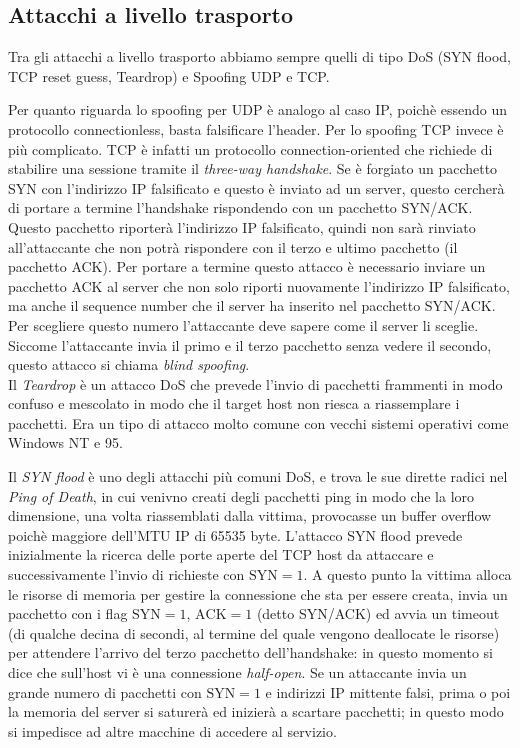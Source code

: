 \subsection{Attacchi a livello trasporto}
Tra gli attacchi a livello trasporto abbiamo sempre quelli di tipo DoS (SYN flood, TCP reset guess, Teardrop) e Spoofing UDP e TCP.

Per quanto riguarda lo spoofing per UDP è analogo al caso IP, poichè essendo un protocollo connectionless, basta falsificare l'header. Per lo spoofing TCP invece è più complicato. TCP è infatti un protocollo connection-oriented che richiede di stabilire una sessione tramite il \textit{three-way handshake}. Se è forgiato un pacchetto SYN con l'indirizzo IP falsificato e questo è inviato ad un server, questo cercherà di portare a termine l'handshake rispondendo con un pacchetto SYN/ACK. Questo pacchetto riporterà l'indirizzo IP falsificato, quindi non sarà rinviato all'attaccante che non potrà rispondere con il terzo e ultimo pacchetto (il pacchetto ACK). Per portare a termine questo attacco è necessario inviare un pacchetto ACK al server che non solo riporti nuovamente l'indirizzo IP falsificato, ma anche il sequence number che il server ha inserito nel pacchetto SYN/ACK. Per scegliere questo numero l'attaccante deve sapere come il server li sceglie. Siccome l'attaccante invia il primo e il terzo pacchetto senza vedere il secondo, questo attacco si chiama \textit{blind spoofing}.\\

Il \textit{Teardrop} è un attacco DoS che prevede l'invio di pacchetti frammenti in modo confuso e mescolato in modo che il target host non riesca a riassemplare i pacchetti. Era un tipo di attacco molto comune con vecchi sistemi operativi come Windows NT e 95. 

Il \textit{SYN flood} è uno degli attacchi più comuni DoS, e trova le sue dirette radici nel \textit{Ping of Death}, in cui venivno creati degli pacchetti ping in modo che la loro dimensione, una volta riassemblati dalla vittima, provocasse un buffer overflow poichè maggiore dell'MTU IP di 65535 byte. L'attacco SYN flood prevede inizialmente la ricerca delle porte aperte del TCP host da attaccare e successivamente l'invio di richieste con $\text{SYN}=1$. A questo punto la vittima alloca le risorse di memoria per gestire la connessione che sta per essere creata, invia un pacchetto con i flag $\text{SYN}=1$, $\text{ACK}=1$ (detto SYN/ACK) ed avvia un timeout (di qualche decina di secondi, al termine del quale vengono deallocate le risorse) per attendere l'arrivo del terzo pacchetto dell'handshake: in questo momento si dice che sull'host vi è una connessione \textit{half-open}. Se un attaccante invia un grande numero di pacchetti con $\text{SYN}=1$ e indirizzi IP mittente falsi, prima o poi la memoria del server si saturerà ed inizierà a scartare pacchetti; in questo modo si impedisce ad altre macchine di accedere al servizio.\\

